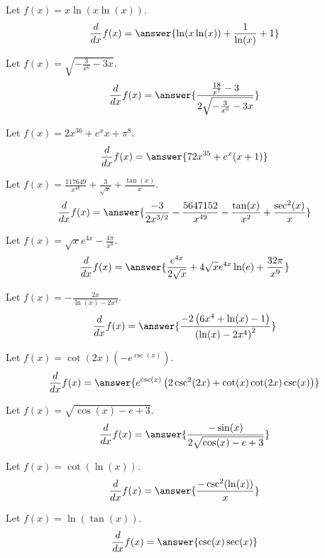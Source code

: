 \documentclass{ximera}
\begin{document}
\begin{shuffle}
\begin{exercise}
Let $f(x)=x \ln (x \ln (x))$.
\[
\ddx f(x) = \answer{\ln (x \ln (x))+\frac{1}{\ln (x)}+1}
\]
\end{exercise}

\begin{exercise}
Let $f(x)=\sqrt{-\frac{3}{x^6}-3 x}$.
\[
\ddx f(x) = \answer{\frac{\frac{18}{x^7}-3}{2 \sqrt{-\frac{3}{x^6}-3 x}}}
\]
\end{exercise}

\begin{exercise}
Let $f(x)=2 x^{36}+e^x x+\pi ^8$.
\[
\ddx f(x) = \answer{72 x^{35}+e^x (x+1)}
\]
\end{exercise}

\begin{exercise}
Let $f(x)=\frac{117649}{x^{48}}+\frac{3}{\sqrt{x}}+\frac{\tan (x)}{x}$.
\[
\ddx f(x) = \answer{\frac{-3}{2 x^{3/2}}-\frac{5647152}{x^{49}}-\frac{\tan (x)}{x^2}+\frac{\sec ^2(x)}{x}}
\]
\end{exercise}

\begin{exercise}
Let $f(x)=\sqrt{x} e^{4 x}-\frac{4 \pi }{x^8}$.
\[
\ddx f(x) = \answer{\frac{e^{4 x}}{2 \sqrt{x}}+4 \sqrt{x} e^{4 x} \ln (e)+\frac{32 \pi }{x^9}}
\]
\end{exercise}

\begin{exercise}
Let $f(x)=-\frac{2 x}{\ln (x)-2 x^4}$.
\[
\ddx f(x) = \answer{\frac{-2 \left(6 x^4+\ln (x)-1\right)}{\left(\ln (x)-2 x^4\right)^2}}
\]
\end{exercise}

\begin{exercise}
Let $f(x)=\cot (2 x) \left(-e^{\csc (x)}\right)$.
\[
\ddx f(x) = \answer{e^{\csc (x)} \left(2 \csc ^2(2 x)+\cot (x) \cot (2 x) \csc (x)\right)}
\]
\end{exercise}

\begin{exercise}
Let $f(x)=\sqrt{\cos (x)-e+3}$.
\[
\ddx f(x) = \answer{\frac{-\sin (x)}{2 \sqrt{\cos (x)-e+3}}}
\]
\end{exercise}

\begin{exercise}
Let $f(x)=\cot (\ln (x))$.
\[
\ddx f(x) = \answer{\frac{-\csc ^2(\ln (x))}{x}}
\]
\end{exercise}

\begin{exercise}
Let $f(x)=\ln (\tan (x))$.
\[
\ddx f(x) = \answer{\csc (x) \sec (x)}
\]
\end{exercise}


\end{shuffle}
\end{document}
